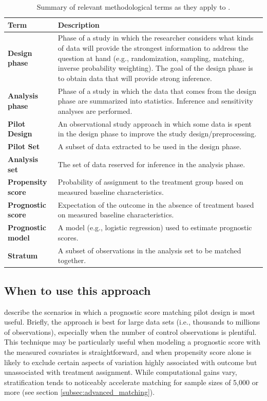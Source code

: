 \begin{table}[t!]
\centering
 \begin{tabular} {p{2.8cm}p{10.3cm}} \toprule
 Term      &  Description \\ \midrule
\textbf{Design phase} & Phase of a study in which the researcher considers what kinds of data will provide the strongest information to address the question at hand (e.g., randomization, sampling, matching, inverse probability weighting). The goal of the design phase is to obtain data that will provide strong inference. \\
\textbf{Analysis phase} & Phase of a study in which the data that comes from the design phase are summarized into statistics. Inference and sensitivity analyses are performed. \\
\textbf{Pilot Design} & An observational study approach in which some data is spent in the design phase to improve the study design/preprocessing. \\
\textbf{Pilot Set} & A subset of data extracted to be used in the design phase. \\
\textbf{Analysis set} & The set of data reserved for inference in the analysis phase. \\
\textbf{Propensity score} & Probability of assignment to the treatment group based on measured baseline characteristics. \\
\textbf{Prognostic score} & Expectation of the outcome in the absence of treatment based on measured baseline characteristics. \\
\textbf{Prognostic model} & A model (e.g., logistic regression) used to estimate prognostic scores.\\
\textbf{Stratum} & A subset of observations in the analysis set to be matched together.\\
 \bottomrule
 \end{tabular}
 \caption{\label{tab:defs} Summary of relevant methodological terms as they apply to .}
 \end{table}
 
\subsection{When to use this approach}\label{subsec:when_to_use}

\citet{aikens2020pilot} describe the scenarios in which a prognostic score matching pilot design is most useful.  Briefly, the  approach is best for large data sets (i.e., thousands to millions of observations), especially when the number of control observations is plentiful. This technique may be particularly useful when modeling a prognostic score with the measured covariates is straightforward, and when propensity score alone is likely to exclude certain aspects of variation highly associated with outcome but unassociated with treatment assignment. While computational gains vary, stratification tends to noticeably accelerate matching for sample sizes of 5,000 or more (see section \ref{subsec:advanced_matching}). 

